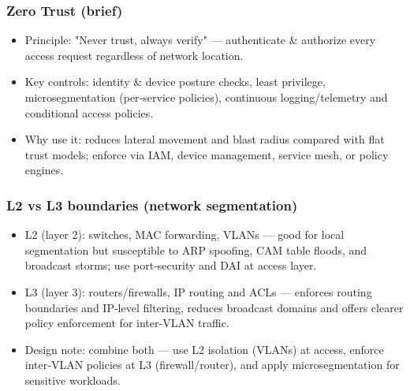 \documentclass{article}
\begin{document}
\subsubsection{Zero Trust (brief)}
\begin{itemize}
  \item Principle: "Never trust, always verify" — authenticate \& authorize every access request regardless of network location.
  \item Key controls: identity \& device posture checks, least privilege, microsegmentation (per‑service policies), continuous logging/telemetry and conditional access policies.
  \item Why use it: reduces lateral movement and blast radius compared with flat trust models; enforce via IAM, device management, service mesh, or policy engines.
\end{itemize}

\subsubsection{L2 vs L3 boundaries (network segmentation)}
\begin{itemize}
  \item L2 (layer 2): switches, MAC forwarding, VLANs — good for local segmentation but susceptible to ARP spoofing, CAM table floods, and broadcast storms; use port‑security and DAI at access layer.
  \item L3 (layer 3): routers/firewalls, IP routing and ACLs — enforces routing boundaries and IP‑level filtering, reduces broadcast domains and offers clearer policy enforcement for inter‑VLAN traffic.
  \item Design note: combine both — use L2 isolation (VLANs) at access, enforce inter‑VLAN policies at L3 (firewall/router), and apply microsegmentation for sensitive workloads.
\end{itemize}
\end{document}
